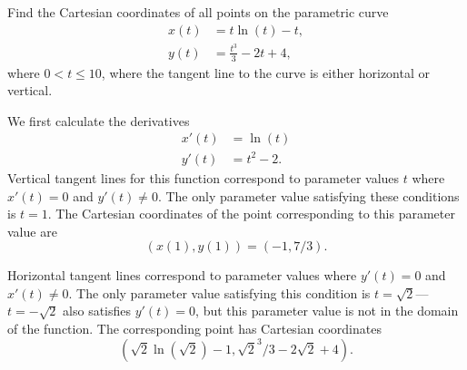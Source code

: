 \documentclass[noauthor,handout]{ximera}
\begin{document}
\begin{problem}
Find the Cartesian coordinates of all points on the parametric curve
\begin{align*}
x(t) &= t \ln (t) - t,\\
y(t) &= \frac{t^3}{3}-2t + 4,
\end{align*}
where $0< t \leq 10$, where the tangent line to the curve is either horizontal or vertical.

\begin{freeResponse}
We first calculate the derivatives
\begin{align*}
x'(t) &= \ln(t) \\
y'(t) &= t^2 - 2.
\end{align*}
Vertical tangent lines for this function correspond to parameter values $t$ where $x'(t) = 0$ and $y'(t) \neq 0$. The only parameter value satisfying these conditions is $t=1$. The Cartesian coordinates of the point corresponding to this parameter value are 
$$
(x(1),y(1)) = (-1,7/3).
$$

Horizontal tangent lines correspond to parameter values where $y'(t) = 0$ and $x'(t) \neq 0$. The only parameter value satisfying this condition is $t = \sqrt{2}$---$t = -\sqrt{2}$ also satisfies $y'(t) = 0$, but this parameter value is not in the domain of the function. The corresponding point has Cartesian coordinates
$$
(\sqrt{2} \ln(\sqrt{2}) - 1, \sqrt{2}^3/3 - 2 \sqrt{2} + 4).
$$
\end{freeResponse}
\end{problem}
\end{document}
